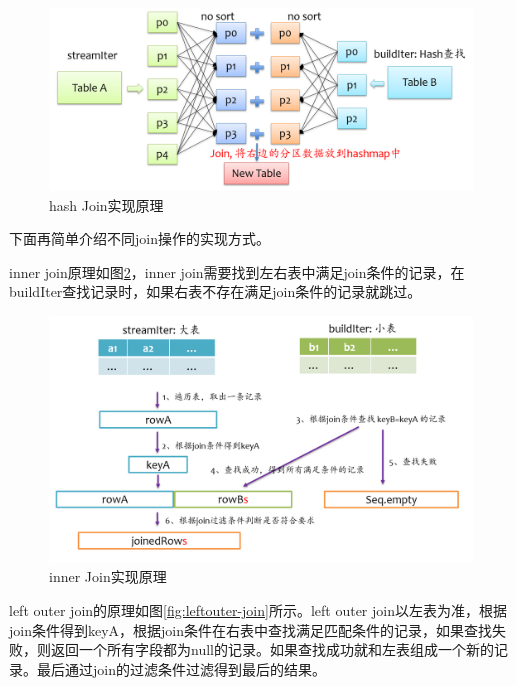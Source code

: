 \begin{figure}[htbp]
    \centering
    \includegraphics[width=1\textwidth]{Img/spark-sql-hash-join.png}
    \caption{hash Join实现原理}
    \label{fig:hash-join}
\end{figure}

下面再简单介绍不同join操作的实现方式。

inner join原理如图\ref{fig:inner-join}，inner join需要找到左右表中满足join条件的记录，在buildIter查找记录时，如果右表不存在满足join条件的记录就跳过。

\begin{figure}[htbp]
    \centering
    \includegraphics[width=1\textwidth]{Img/spark-sql-inner-join.png}
    \caption{inner Join实现原理}
    \label{fig:inner-join}
\end{figure}

left outer join的原理如图\ref{fig:leftouter-join}所示。left outer join以左表为准，根据join条件得到keyA，根据join条件在右表中查找满足匹配条件的记录，如果查找失败，则返回一个所有字段都为null的记录。如果查找成功就和左表组成一个新的记录。最后通过join的过滤条件过滤得到最后的结果。

